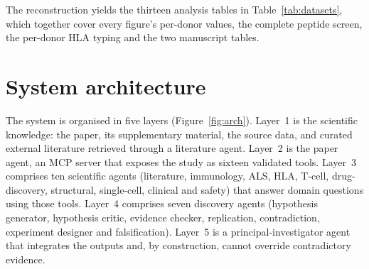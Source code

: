 \documentclass[11pt]{article}
\begin{document}
The reconstruction yields the thirteen analysis tables in Table~\ref{tab:datasets}, which together
cover every figure's per-donor values, the complete peptide screen, the per-donor HLA typing and
the two manuscript tables.

\begin{table}[t]
\centering
\caption{Machine-readable datasets reconstructed from the study's source data.}
\label{tab:datasets}
\footnotesize

\end{table}

\section{System architecture}
The system is organised in five layers (Figure~\ref{fig:arch}). Layer~1 is the scientific
knowledge: the paper, its supplementary material, the source data, and curated external
literature retrieved through a literature agent. Layer~2 is the paper agent, an MCP server that
exposes the study as sixteen validated tools. Layer~3 comprises ten scientific agents (literature,
immunology, ALS, HLA, T-cell, drug-discovery, structural, single-cell, clinical and safety) that
answer domain questions using those tools. Layer~4 comprises seven discovery agents (hypothesis
generator, hypothesis critic, evidence checker, replication, contradiction, experiment designer
and falsification). Layer~5 is a principal-investigator agent that integrates the outputs and, by
construction, cannot override contradictory evidence.
\end{document}
